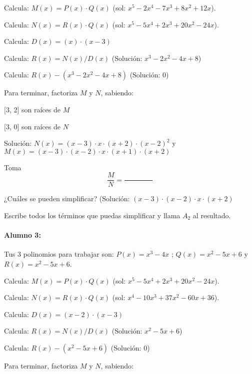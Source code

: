 Calcula: $M(x) = P(x)\cdot  Q(x)$ (sol: $ x^5 - 2x^4 - 7x^3 + 8x^2 + 12x $).

Calcula: $N(x) = R(x)\cdot  Q(x)$ (sol: $ x^5 - 5x^4 + 2x^3 + 20x^2 - 24x $).

Calcula: $D(x) = ( x )\cdot  ( x - 3 )$

Calcula: $R(x) = N(x) / D(x)$ (Solución: $ x^3 - 2x^2 - 4x + 8 $)

Calcula: $R(x) - ( x^3 - 2x^2 - 4x + 8 )$ (Solución: $ 0 $)

Para terminar, factoriza $M$ y $N$, sabiendo:

     [3, 2]  son raíces de $M$

     [3, 0]  son raíces de $N$

Solución: $N(x) =  (x - 3) \cdot  x \cdot  (x + 2) \cdot  (x - 2)^2 $ y $M(x) =  (x - 3) \cdot  (x - 2) \cdot  x \cdot  (x + 1) \cdot  (x + 2) $

Toma \[\frac{M}{N} = \frac{\quad\quad\quad\quad}{\quad\quad\quad\quad}\]

¿Cuáles se pueden simplificar? (Solución: $ (x - 3) \cdot  (x - 2) \cdot  x \cdot  (x + 2) $

Escribe todos los términos que puedas simplificar y llama $A_2$ al resultado.













\paragraph{Alumno 3:\\}



Tus 3 polinomios para trabajar son: $P(x) =  x^3 - 4x $ ; $Q(x) =  x^2 - 5x + 6 $ y $R(x) =  x^2 - 5x + 6 $.



Calcula: $M(x) = P(x)\cdot  Q(x)$ (sol: $ x^5 - 5x^4 + 2x^3 + 20x^2 - 24x $).

Calcula: $N(x) = R(x)\cdot  Q(x)$ (sol: $ x^4 - 10x^3 + 37x^2 - 60x + 36 $).

Calcula: $D(x) = ( x - 2 )\cdot  ( x - 3 )$

Calcula: $R(x) = N(x) / D(x)$ (Solución: $ x^2 - 5x + 6 $)

Calcula: $R(x) - ( x^2 - 5x + 6 )$ (Solución: $ 0 $)

Para terminar, factoriza $M$ y $N$, sabiendo:

